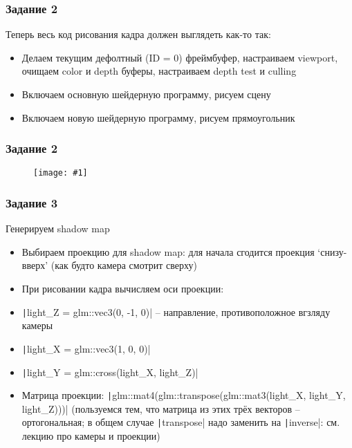 \documentclass[10pt]{beamer}
\newcommand{\slideimage}[1]{
  \begin{figure}
    \begin{adjustbox}{width=\textwidth, totalheight=\textheight-2\baselineskip-2\baselineskip,keepaspectratio}
      \texttt{[image: \#1]}
    \end{adjustbox}
  \end{figure}
}
\begin{document}
\begin{frame}[fragile]
\frametitle{Задание 2}
Теперь весь код рисования кадра должен выглядеть как-то так:
\begin{itemize}
\item Делаем текущим дефолтный (ID = 0) фреймбуфер, настраиваем viewport, очищаем color и depth буферы, настраиваем depth test и culling
\item Включаем основную шейдерную программу, рисуем сцену
\item Включаем новую шейдерную программу, рисуем прямоугольник
\end{itemize}
\end{frame}

\begin{frame}[fragile]
\frametitle{Задание 2}
\slideimage{2.png}
\end{frame}

\begin{frame}[fragile]
\frametitle{Задание 3}
\begin{footnotesize}
Генерируем shadow map
\begin{itemize}
\item Выбираем проекцию для shadow map: для начала сгодится проекция `снизу-вверх' (как будто камера смотрит сверху)
\item При рисовании кадра вычисляем оси проекции:
\item \texttt|light_Z = glm::vec3(0, -1, 0)| -- направление, противоположное вгзляду камеры
\item \texttt|light_X = glm::vec3(1,  0, 0)|
\item \texttt|light_Y = glm::cross(light_X, light_Z)|
\item Матрица проекции: \texttt|glm::mat4(glm::transpose(glm::mat3(light_X, light_Y, light_Z)))| (пользуемся тем, что матрица из этих трёх векторов -- ортогональная; в общем случае \texttt|transpose| надо заменить на \texttt|inverse|: см. лекцию про камеры и проекции)
\end{itemize}
\end{footnotesize}
\end{frame}
\end{document}
